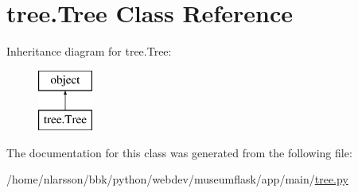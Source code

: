 \hypertarget{classtree_1_1Tree}{}\section{tree.\+Tree Class Reference}
\label{classtree_1_1Tree}
Inheritance diagram for tree.\+Tree\+:\begin{figure}[H]
\begin{center}
\leavevmode
\includegraphics[height=2.000000cm]{classtree_1_1Tree}
\end{center}
\end{figure}


The documentation for this class was generated from the following file\+:\begin{DoxyCompactItemize}
\item 
/home/nlarsson/bbk/python/webdev/museumflask/app/main/\mbox{\hyperlink{tree_8py}{tree.\+py}}\end{DoxyCompactItemize}
